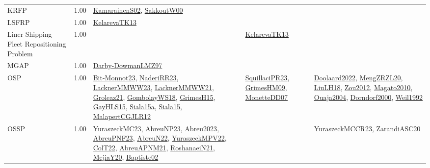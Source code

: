 {\begin{longtable}{p{3cm}r>{\raggedright\arraybackslash}p{6cm}>{\raggedright\arraybackslash}p{6cm}>{\raggedright\arraybackslash}p{8cm}}
\index{KRFP}\index{Classification!KRFP}KRFP &  1.00 & \hyperref[detail:KamarainenS02]{KamarainenS02}, \hyperref[detail:SakkoutW00]{SakkoutW00} &  & \\
\index{LSFRP}\index{Classification!LSFRP}LSFRP &  1.00 & \hyperref[detail:KelarevaTK13]{KelarevaTK13} &  & \\
\index{Liner Shipping Fleet Repositioning Problem}\index{Classification!Liner Shipping Fleet Repositioning Problem}Liner Shipping Fleet Repositioning Problem &  1.00 &  & \hyperref[detail:KelarevaTK13]{KelarevaTK13} & \\
\index{MGAP}\index{Classification!MGAP}MGAP &  1.00 & \hyperref[detail:Darby-DowmanLMZ97]{Darby-DowmanLMZ97} &  & \\
\index{OSP}\index{Classification!OSP}OSP &  1.00 & \hyperref[detail:Bit-Monnot23]{Bit-Monnot23}, \hyperref[detail:NaderiRR23]{NaderiRR23}, \hyperref[detail:LacknerMMWW23]{LacknerMMWW23}, \hyperref[detail:LacknerMMWW21]{LacknerMMWW21}, \hyperref[detail:Groleaz21]{Groleaz21}, \hyperref[detail:GombolayWS18]{GombolayWS18}, \hyperref[detail:GrimesH15]{GrimesH15}, \hyperref[detail:GayHLS15]{GayHLS15}, \hyperref[detail:Siala15a]{Siala15a}, \hyperref[detail:Siala15]{Siala15}, \hyperref[detail:MalapertCGJLR12]{MalapertCGJLR12} & \hyperref[detail:SquillaciPR23]{SquillaciPR23}, \hyperref[detail:GrimesHM09]{GrimesHM09}, \hyperref[detail:MonetteDD07]{MonetteDD07} & \hyperref[detail:Doolaard2022]{Doolaard2022}, \hyperref[detail:MengZRZL20]{MengZRZL20}, \hyperref[detail:LiuLH18]{LiuLH18}, \hyperref[detail:Zou2012]{Zou2012}, \hyperref[detail:Magato2010]{Magato2010}, \hyperref[detail:Ouaja2004]{Ouaja2004}, \hyperref[detail:Dorndorf2000]{Dorndorf2000}, \hyperref[detail:Weil1992]{Weil1992}\\
\index{OSSP}\index{Classification!OSSP}OSSP &  1.00 & \hyperref[detail:YuraszeckMC23]{YuraszeckMC23}, \hyperref[detail:AbreuNP23]{AbreuNP23}, \hyperref[detail:Abreu2023]{Abreu2023}, \hyperref[detail:AbreuPNF23]{AbreuPNF23}, \hyperref[detail:AbreuN22]{AbreuN22}, \hyperref[detail:YuraszeckMPV22]{YuraszeckMPV22}, \hyperref[detail:ColT22]{ColT22}, \hyperref[detail:AbreuAPNM21]{AbreuAPNM21}, \hyperref[detail:RoshanaeiN21]{RoshanaeiN21}, \hyperref[detail:MejiaY20]{MejiaY20}, \hyperref[detail:Baptiste02]{Baptiste02} &  & \hyperref[detail:YuraszeckMCCR23]{YuraszeckMCCR23}, \hyperref[detail:ZarandiASC20]{ZarandiASC20}\\

\end{longtable}}
